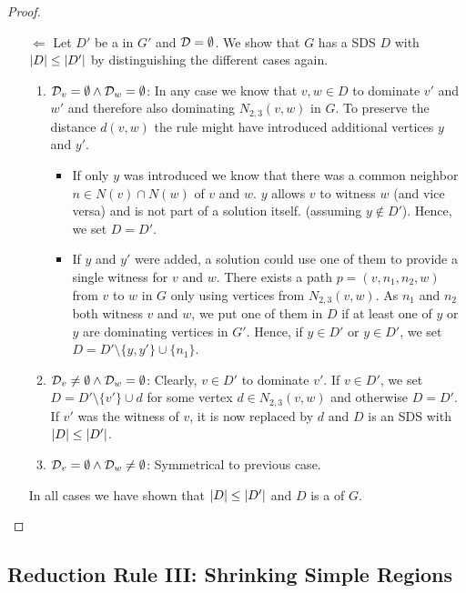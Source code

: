 \begin{proof}
\begin{enumerate}
        \item[$\Leftarrow$] Let $D'$ be a \sdom in $G'$ and $\mathcal{D} =  \emptyset$. We show that $G$ has a SDS $D$ with $\abs{D} \leq \abs{D'}$ by distinguishing the different cases again. 
        \begin{enumerate}
            \item  $\mathcal{D}_{v} = \emptyset \wedge \mathcal{D}_{w} = \emptyset$: In any case we know that $v,w \in D$ to dominate $v'$ and $w'$ and therefore also dominating $N_{2,3}(v,w)$ in $G$. To preserve the distance $d(v,w)$ the rule might have introduced additional vertices $y$ and $y'$.            
            \begin{itemize}
                \item If only $y$ was introduced we know that there was a common neighbor $n \in N(v) \cap N(w)$ of $v$ and $w$. $y$ allows $v$ to witness $w$ (and vice versa) and is not part of a solution itself. (assuming $y \notin D'$). Hence, we set $D = D'$.
                \item If $y$ and $y'$ were added, a solution could use one of them to provide a single witness for $v$ and $w$. There exists a path $p = (v, n_1, n_2, w)$ from $v$ to $w$ in $G$ only using vertices from $N_{2,3}(v,w)$. As $n_1$ and $n_2$ both witness $v$ and $w$, we put one of them in $D$ if at least one of $y$ or $y$ are dominating vertices in $G'$.
                Hence, if $y \in D'$ or $y \in D'$, we set $D = D' \setminus \{y,y'\} \cup \{n_1\}$.
            \end{itemize}
            \item  $\mathcal{D}_{v} \neq \emptyset \wedge \mathcal{D}_{w} = \emptyset$: Clearly, $v \in D'$ to dominate $v'$. If $v \in D'$, we set $D =  D' \setminus \{v'\} \cup d$ for some vertex $d \in N_{2,3}(v,w)$ and otherwise $D = D'$. If $v'$ was the witness of $v$, it is now replaced by $d$ and $D$ is an SDS with $\abs{D} \leq \abs{D'}$.
            \item  $\mathcal{D}_{v} = \emptyset \wedge \mathcal{D}_{w} \neq \emptyset$: Symmetrical to previous case.
        \end{enumerate} 
        In all cases we have shown that $\abs{D} \leq \abs{D'}$ and $D$ is a \sdom of $G$.
    \end{enumerate}

\end{proof}
\subsection{Reduction Rule III: Shrinking Simple Regions}


